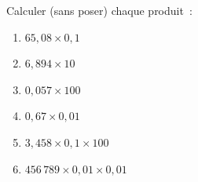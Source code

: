 \documentclass[exercice]{thedocument}%
\begin{document}
%
Calculer (sans poser) chaque produit~:
\begin{enumerate}
    \item $65,08\times0,1$
    \item $6,894\times10$
    \item $0,057\times100$
    \item $0,67\times0,01$
    \item $3,458\times0,1\times100$
    \item $456\,789\times0,01\times0,01$
\end{enumerate}
\end{document}
